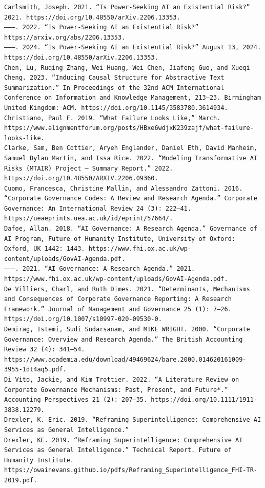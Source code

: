 \documentclass[
  11pt,
  letterpaper,
]{book}
\begin{document}
\begin{verbatim}
Carlsmith, Joseph. 2021. “Is Power-Seeking AI an Existential Risk?” 2021. https://doi.org/10.48550/arXiv.2206.13353.
———. 2022. “Is Power-Seeking AI an Existential Risk?” https://arxiv.org/abs/2206.13353.
———. 2024. “Is Power-Seeking AI an Existential Risk?” August 13, 2024. https://doi.org/10.48550/arXiv.2206.13353.
Chen, Lu, Ruqing Zhang, Wei Huang, Wei Chen, Jiafeng Guo, and Xueqi Cheng. 2023. “Inducing Causal Structure for Abstractive Text Summarization.” In Proceedings of the 32nd ACM International Conference on Information and Knowledge Management, 213–23. Birmingham United Kingdom: ACM. https://doi.org/10.1145/3583780.3614934.
Christiano, Paul F. 2019. “What Failure Looks Like,” March. https://www.alignmentforum.org/posts/HBxe6wdjxK239zajf/what-failure-looks-like.
Clarke, Sam, Ben Cottier, Aryeh Englander, Daniel Eth, David Manheim, Samuel Dylan Martin, and Issa Rice. 2022. “Modeling Transformative AI Risks (MTAIR) Project – Summary Report.” 2022. https://doi.org/10.48550/ARXIV.2206.09360.
Cuomo, Francesca, Christine Mallin, and Alessandro Zattoni. 2016. “Corporate Governance Codes: A Review and Research Agenda.” Corporate Governance: An International Review 24 (3): 222–41. https://ueaeprints.uea.ac.uk/id/eprint/57664/.
Dafoe, Allan. 2018. “AI Governance: A Research Agenda.” Governance of AI Program, Future of Humanity Institute, University of Oxford: Oxford, UK 1442: 1443. https://www.fhi.ox.ac.uk/wp-content/uploads/GovAI-Agenda.pdf.
———. 2021. “AI Governance: A Research Agenda.” 2021. https://www.fhi.ox.ac.uk/wp-content/uploads/GovAI-Agenda.pdf.
De Villiers, Charl, and Ruth Dimes. 2021. “Determinants, Mechanisms and Consequences of Corporate Governance Reporting: A Research Framework.” Journal of Management and Governance 25 (1): 7–26. https://doi.org/10.1007/s10997-020-09530-0.
Demirag, Istemi, Sudi Sudarsanam, and MIKE WRIGHT. 2000. “Corporate Governance: Overview and Research Agenda.” The British Accounting Review 32 (4): 341–54. https://www.academia.edu/download/49469624/bare.2000.014620161009-3955-1dt4aq5.pdf.
Di Vito, Jackie, and Kim Trottier. 2022. “A Literature Review on Corporate Governance Mechanisms: Past, Present, and Future*.” Accounting Perspectives 21 (2): 207–35. https://doi.org/10.1111/1911-3838.12279.
Drexler, K. Eric. 2019. “Reframing Superintelligence: Comprehensive AI Services as General Intelligence.”
Drexler, KE. 2019. “Reframing Superintelligence: Comprehensive AI Services as General Intelligence.” Technical Report. Future of Humanity Institute. https://owainevans.github.io/pdfs/Reframing_Superintelligence_FHI-TR-2019.pdf.

\end{verbatim}
\end{document}

